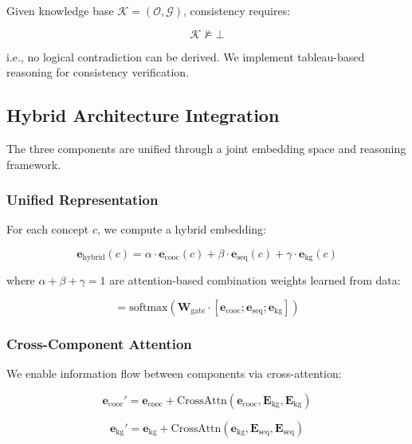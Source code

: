 \documentclass[conference]{IEEEtran}
\begin{document}
Given knowledge base $\mathcal{K} = (\mathcal{O}, \mathcal{G})$, consistency requires:

\begin{equation}
\mathcal{K} \not\models \bot
\end{equation}

i.e., no logical contradiction can be derived. We implement tableau-based reasoning for consistency verification.

\subsection{Hybrid Architecture Integration}

The three components are unified through a joint embedding space and reasoning framework.

\subsubsection{Unified Representation}

For each concept $c$, we compute a hybrid embedding:

\begin{equation}
\mathbf{e}_{\text{hybrid}}(c) = \alpha \cdot \mathbf{e}_{\text{cooc}}(c) + \beta \cdot \mathbf{e}_{\text{seq}}(c) + \gamma \cdot \mathbf{e}_{\text{kg}}(c)
\end{equation}

where $\alpha + \beta + \gamma = 1$ are attention-based combination weights learned from data:

\begin{equation}
[\alpha, \beta, \gamma] = \text{softmax}(\mathbf{W}_{\text{gate}} \cdot [\mathbf{e}_{\text{cooc}}; \mathbf{e}_{\text{seq}}; \mathbf{e}_{\text{kg}}])
\end{equation}

\subsubsection{Cross-Component Attention}

We enable information flow between components via cross-attention:

\begin{equation}
\mathbf{e}_{\text{cooc}}' = \mathbf{e}_{\text{cooc}} + \text{CrossAttn}(\mathbf{e}_{\text{cooc}}, \mathbf{E}_{\text{kg}}, \mathbf{E}_{\text{kg}})
\end{equation}

\begin{equation}
\mathbf{e}_{\text{kg}}' = \mathbf{e}_{\text{kg}} + \text{CrossAttn}(\mathbf{e}_{\text{kg}}, \mathbf{E}_{\text{seq}}, \mathbf{E}_{\text{seq}})
\end{equation}
\end{document}
